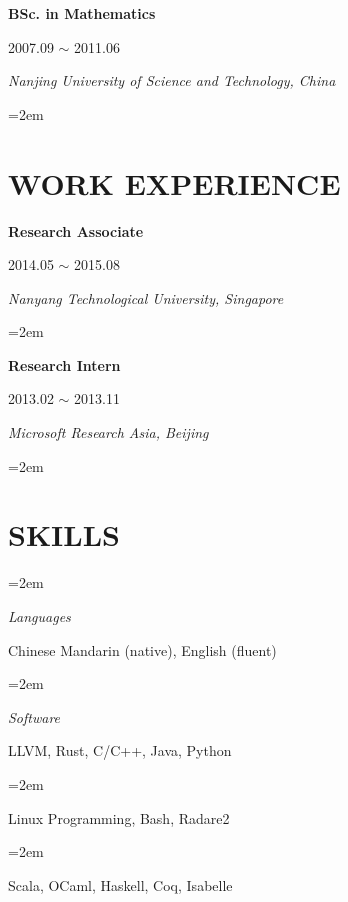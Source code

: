 \documentclass[paper=a4,fontsize=11pt]{article} %
\newlength{\spacebox}
\newcommand{\sepspace}{\vspace*{9pt}}		%
\newcommand{\NewPart}[1]{\section*{\uppercase{#1}}}
\newcommand{\PersonalEntry}[2]{
		\noindent\hangindent=2em\hangafter=0 %
		\parbox{\spacebox}{        %
		\textit{#1}}		       %
		\hspace{1.5em} #2 \par}    %
\newcommand{\SkillsEntry}[2]{      %
		\noindent\hangindent=2em\hangafter=0 %
		\parbox{\spacebox}{        %
		\textit{#1}}			   %
		\hspace{1.5em} #2 \par}    %
\newcommand{\EducationEntry}[4]{
		\noindent \textbf{#1} \hfill      %
			\parbox{16em}{%
			\hfill\color{Black}#2} \par  %
		\noindent \textit{#3} \par        %
        \noindent\hangindent=2em\hangafter=0\small #4 %
		\normalsize \par}
\begin{document}
\EducationEntry{BSc. in Mathematics}{2007.09 $\sim$ 2011.06}{Nanjing University of Science and Technology, China}{}

\NewPart{Work experience}{}

\EducationEntry{Research Associate}{2014.05 $\sim$ 2015.08}{Nanyang Technological University, Singapore}{
}
\sepspace

\EducationEntry{Research Intern}{2013.02 $\sim$ 2013.11}{Microsoft Research Asia, Beijing}{
}
\sepspace

\NewPart{Skills}{}

\SkillsEntry{Languages}{Chinese Mandarin (native), English (fluent)}
\SkillsEntry{Software}{{LLVM, Rust, C/C++, Java, Python}}
\SkillsEntry{}{Linux Programming, Bash, Radare2}
\SkillsEntry{}{Scala, OCaml, Haskell, Coq, Isabelle}

\pagebreak

 
% 


\pagebreak
\end{document}
